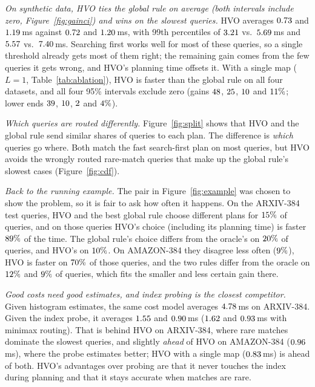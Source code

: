 \documentclass[sigconf,nonacm]{acmart}
\begin{document}
\emph{On synthetic data, HVO ties the global rule on average (both intervals include zero, Figure~\ref{fig:gainci}) and wins on the slowest queries.} HVO averages $0.73$ and $1.19$\,ms against $0.72$ and $1.20$\,ms, with 99th percentiles of $3.21$ vs.\ $5.69$\,ms and $5.57$ vs.\ $7.40$\,ms. Searching first works well for most of these queries, so a single threshold already gets most of them right; the remaining gain comes from the few queries it gets wrong, and HVO's planning time offsets it. With a single map ($L=1$, Table~\ref{tab:ablation}), HVO is faster than the global rule on all four datasets, and all four 95\% intervals exclude zero (gains $48$, $25$, $10$ and $11\%$; lower ends $39$, $10$, $2$ and $4\%$).

\emph{Which queries are routed differently.} Figure~\ref{fig:split} shows that HVO and the global rule send similar shares of queries to each plan. The difference is \emph{which} queries go where. Both match the fast search-first plan on most queries, but HVO avoids the wrongly routed rare-match queries that make up the global rule's slowest cases (Figure~\ref{fig:cdf}).

\emph{Back to the running example.} The pair in Figure~\ref{fig:example} was chosen to show the problem, so it is fair to ask how often it happens. On the ARXIV-384 test queries, HVO and the best global rule choose different plans for $15\%$ of queries, and on those queries HVO's choice (including its planning time) is faster $89\%$ of the time. The global rule's choice differs from the oracle's on $20\%$ of queries, and HVO's on $10\%$. On AMAZON-384 they disagree less often ($9\%$), HVO is faster on $70\%$ of those queries, and the two rules differ from the oracle on $12\%$ and $9\%$ of queries, which fits the smaller and less certain gain there.

\emph{Good costs need good estimates, and index probing is the closest competitor.} Given histogram estimates, the same cost model averages $4.78$\,ms on ARXIV-384. Given the index probe, it averages $1.55$ and $0.90$\,ms ($1.62$ and $0.93$\,ms with minimax routing). That is behind HVO on ARXIV-384, where rare matches dominate the slowest queries, and slightly \emph{ahead} of HVO on AMAZON-384 ($0.96$\,ms), where the probe estimates better; HVO with a single map ($0.83$\,ms) is ahead of both. HVO's advantages over probing are that it never touches the index during planning and that it stays accurate when matches are rare.
\end{document}
